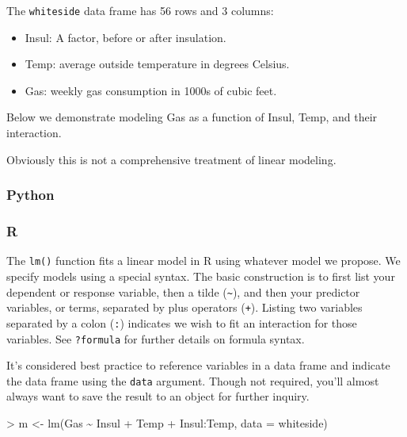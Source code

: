 \documentclass[
]{book}
\newenvironment{Shaded}{\begin{snugshade}}{\end{snugshade}}
\newcommand{\AttributeTok}[1]{\textcolor[rgb]{0.77,0.63,0.00}{#1}}
\newcommand{\FunctionTok}[1]{\textcolor[rgb]{0.00,0.00,0.00}{#1}}
\newcommand{\NormalTok}[1]{#1}
\newcommand{\OtherTok}[1]{\textcolor[rgb]{0.56,0.35,0.01}{#1}}
\newcommand{\SpecialCharTok}[1]{\textcolor[rgb]{0.00,0.00,0.00}{#1}}
\providecommand{\tightlist}{%
  \setlength{\itemsep}{0pt}\setlength{\parskip}{0pt}}
\begin{document}
The \texttt{whiteside} data frame has 56 rows and 3 columns:

\begin{itemize}
\tightlist
\item
  Insul: A factor, before or after insulation.
\item
  Temp: average outside temperature in degrees Celsius.
\item
  Gas: weekly gas consumption in 1000s of cubic feet.
\end{itemize}

Below we demonstrate modeling Gas as a function of Insul, Temp, and their interaction.

Obviously this is not a comprehensive treatment of linear modeling.

\hypertarget{python-49}{%
\subsubsection*{Python}\label{python-49}}

\hypertarget{r-49}{%
\subsubsection*{R}\label{r-49}}

The \texttt{lm()} function fits a linear model in R using whatever model we propose. We specify models using a special syntax. The basic construction is to first list your dependent or response variable, then a tilde (\texttt{\textasciitilde{}}), and then your predictor variables, or terms, separated by plus operators (\texttt{+}). Listing two variables separated by a colon (\texttt{:}) indicates we wish to fit an interaction for those variables. See \texttt{?formula} for further details on formula syntax.

It's considered best practice to reference variables in a data frame and indicate the data frame using the \texttt{data} argument. Though not required, you'll almost always want to save the result to an object for further inquiry.

\begin{Shaded}
\begin{Highlighting}[]
\SpecialCharTok{\textgreater{}}\NormalTok{ m }\OtherTok{\textless{}{-}} \FunctionTok{lm}\NormalTok{(Gas }\SpecialCharTok{\textasciitilde{}}\NormalTok{ Insul }\SpecialCharTok{+}\NormalTok{ Temp }\SpecialCharTok{+}\NormalTok{ Insul}\SpecialCharTok{:}\NormalTok{Temp, }\AttributeTok{data =}\NormalTok{ whiteside)}
\end{Highlighting}
\end{Shaded}
\end{document}
